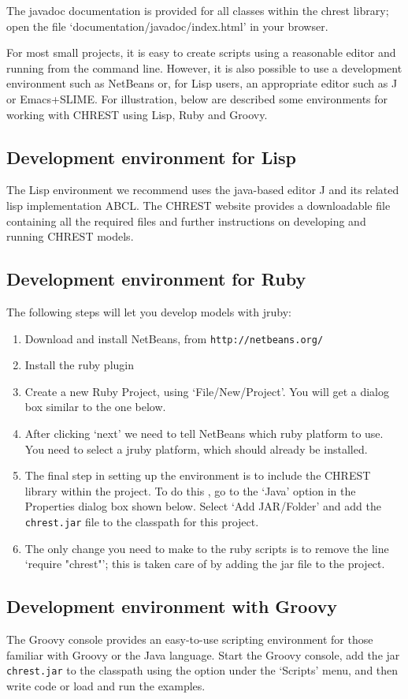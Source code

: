 \documentclass{article}
\begin{document}
The javadoc documentation is provided for all classes within the chrest library; 
open the file `documentation/javadoc/index.html' in your browser.  

For most small projects, it is easy to create scripts using a reasonable editor
and running from the command line.  However, it is also possible to use a
development environment such as NetBeans or, for Lisp users, an appropriate
editor such as J or Emacs+SLIME.  For illustration, below are described some
environments for working with CHREST using Lisp, Ruby and Groovy.

\subsection{Development environment for Lisp}

The Lisp environment we recommend uses the java-based editor J and its related
lisp implementation ABCL.  The CHREST website provides a downloadable file
containing all the required files and further instructions on developing and
running CHREST models.

\subsection{Development environment for Ruby}

The following steps will let you develop models with jruby:

\begin{enumerate}
\item Download and install NetBeans, from {\tt http://netbeans.org/}
\item Install the ruby plugin
\item Create a new Ruby Project, using `File/New/Project'.  You will get a
dialog box similar to the one below.
\item After clicking `next' we need to tell NetBeans which ruby platform to
use.  You need to select a jruby platform, which should already be installed.
\item The final step in setting up the environment is to include the CHREST
library within the project. To do this , go to the `Java' option in the
Properties dialog box shown below. Select `Add JAR/Folder' and add the
{\tt chrest.jar} file to the classpath for this project. 
\item The only change you need to make to the ruby scripts is to remove the
line `require "chrest"'; this is taken care of by adding the jar file to the
project.
\end{enumerate}

\subsection{Development environment with Groovy}

The Groovy console provides an easy-to-use scripting environment for those
familiar with Groovy or the Java language.  Start the Groovy console, 
add the jar {\tt chrest.jar} to the classpath using the option under the `Scripts' 
menu, and then write code or load and run the examples.
\end{document}
